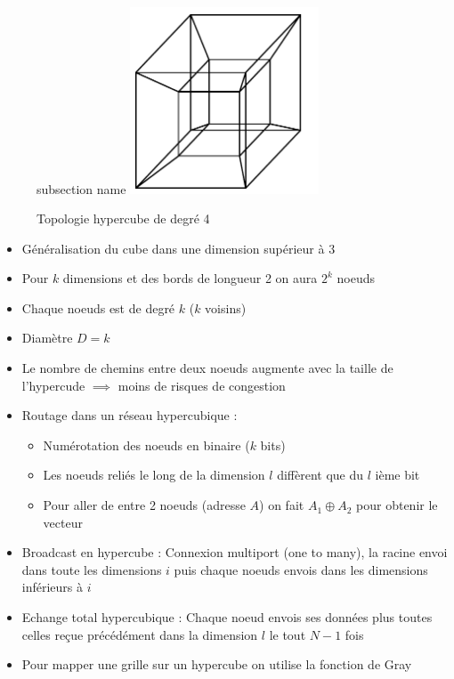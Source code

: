 \documentclass[12pt,a4paper,oneside, titlepage]{article}
\begin{document}
      \begin{figure}[H]subsection name
        \centering
        \includegraphics[width=0.5\textwidth]{images/hyp}
        \caption{Topologie hypercube de degré 4}
      \end{figure}

      \begin{itemize}
        \item Généralisation du cube dans une dimension supérieur à 3
        \item Pour $k$ dimensions et des bords de longueur 2 on aura $2^k$ noeuds
        \item Chaque noeuds est de degré $k$ ($k$ voisins)
        \item Diamètre $D = k$
        \item Le nombre de chemins entre deux noeuds augmente avec la taille de l'hypercude $\implies$ moins de risques de congestion
        \item Routage dans un réseau hypercubique :
        \begin{itemize}
          \item Numérotation des noeuds en binaire ($k$ bits)
          \item Les noeuds reliés le long de la dimension $l$ diffèrent que du $l$ ième bit
          \item Pour aller de entre 2 noeuds (adresse $A$) on fait $A_1 \oplus A_2$ pour obtenir le vecteur
        \end{itemize}
        \item Broadcast en hypercube : Connexion multiport (one to many), la racine envoi dans toute les dimensions $i$ puis chaque noeuds envois dans les dimensions inférieurs à $i$
        \item Echange total hypercubique : Chaque noeud envois ses données plus toutes celles reçue précédément dans la dimension $l$ le tout $N-1$ fois
        \item Pour mapper une grille sur un hypercube on utilise la fonction de Gray
      \end{itemize}
\end{document}
